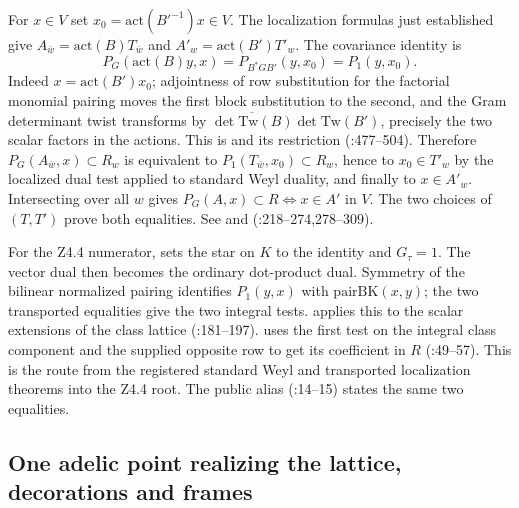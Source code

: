 For $x\in V$ set $x_0=\mathrm{act}(B'^{-1})x\in V$.
The localization formulas just established give
$A_{\bar w}=\mathrm{act}(B)T_{\bar w}$ and
$A'_w=\mathrm{act}(B')T'_w$. The covariance identity is
\[
 P_G(\mathrm{act}(B)y,x)
   =P_{B^*GB'}(y,x_0)=P_1(y,x_0).
\]
Indeed $x=\mathrm{act}(B')x_0$; adjointness of row substitution for
the factorial monomial pairing moves the first block substitution
to the second, and the Gram determinant twist transforms by
$\overline{\det\mathrm{Tw}(B)}\det\mathrm{Tw}(B')$, precisely
the two scalar factors in the actions. This is 
and its restriction 
(:477--504).
Therefore $P_G(A_{\bar w},x)\subset R_w$ is equivalent to
$P_1(T_{\bar w},x_0)\subset R_w$, hence to $x_0\in T'_w$ by
the localized dual test applied to standard Weyl duality, and
finally to $x\in A'_w$. Intersecting over all $w$ gives
$P_G(A,x)\subset R\iff x\in A'$ in $V$. The two choices of
$(T,T')$ prove both equalities. See  and
(:218--274,278--309).

For the Z4.4 numerator, 
sets the star on $K$ to the identity and $G_\tau=1$. The vector
dual then becomes the ordinary dot-product dual. Symmetry of the
bilinear normalized pairing identifies $P_1(y,x)$ with
$\mathrm{pairBK}(x,y)$; the two transported equalities give
the two integral tests.  applies
this to the scalar extensions of the class lattice
(:181--197).
 uses the first test on the integral
class component and the supplied opposite row to get its coefficient
in $R$ (:49--57).
This is the route from the registered standard Weyl and transported
localization theorems into the Z4.4 root. The public alias
(:14--15)
states the same two equalities.

\subsection{One adelic point realizing the lattice, decorations and frames}\label{r12:point}

